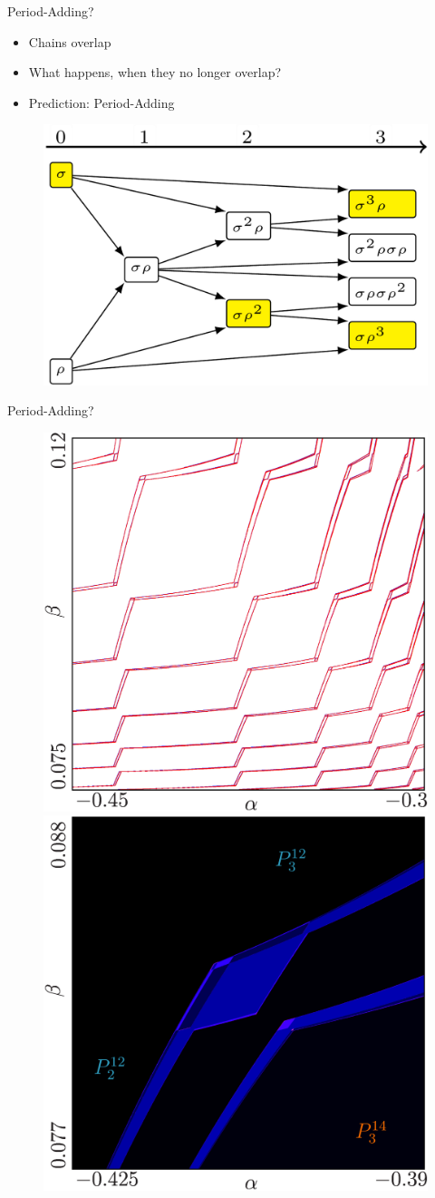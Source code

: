 \begin{frame}{Period-Adding?}
	\vspace{-1em}
	\begin{itemize}
		\item Chains overlap
		\item What happens, when they no longer overlap?
		      \vspace{1em}
		\item Prediction: Period-Adding
	\end{itemize}
	\begin{figure}
		\includegraphics[height=.5 \textheight]{Figs/Trees/ClassicalAdding/adding.png}
	\end{figure}
\end{frame}

\begin{frame}{Period-Adding?}
	\begin{figure}
		\includegraphics[width=.4 \textwidth]{Figs/archetypal_model_regions_drifting_apart.png}
		\quad
		\includegraphics[width=.4 \textwidth]{Figs/archetypal_model_adding_like_period_corner.png}
	\end{figure}
\end{frame}

